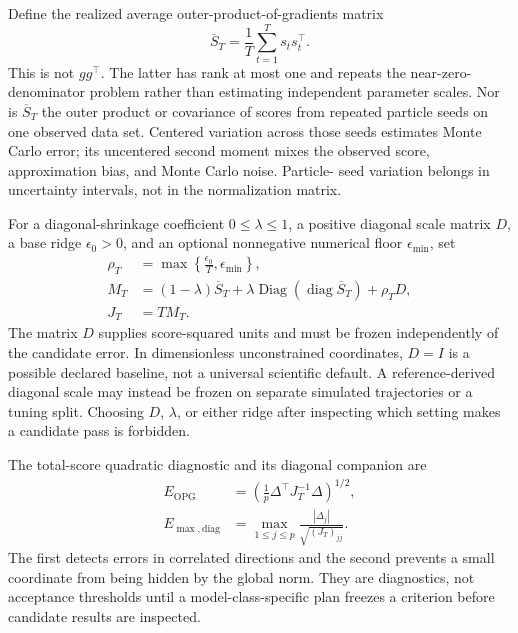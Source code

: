 Define the realized average outer-product-of-gradients matrix
\begin{equation}
  \overline S_T=\frac{1}{T}\sum_{t=1}^T s_t s_t^\top.
  \label{eq:bf-ledh-average-opg}
\end{equation}
This is not \(gg^\top\).  The latter has rank at most one and repeats the
near-zero-denominator problem rather than estimating independent parameter
scales.  Nor is \(\overline S_T\) the outer product or covariance of scores
from repeated particle seeds on one observed data set.  Centered variation
across those seeds estimates Monte Carlo error; its uncentered second moment
mixes the observed score, approximation bias, and Monte Carlo noise.  Particle-
seed variation belongs in uncertainty intervals, not in the normalization
matrix.

For a diagonal-shrinkage coefficient \(0\leq\lambda\leq1\), a positive
diagonal scale matrix \(D\), a base ridge \(\epsilon_0>0\), and an optional
nonnegative numerical floor \(\epsilon_{\min}\), set
\begin{align}
  \rho_T&=\max\left\{\frac{\epsilon_0}{T},\epsilon_{\min}\right\},
  \label{eq:bf-ledh-average-opg-ridge}\\
  M_T&=(1-\lambda)\overline S_T
       +\lambda\operatorname{Diag}(\operatorname{diag}\overline S_T)
       +\rho_TD,
  \label{eq:bf-ledh-average-opg-metric}\\
  J_T&=T M_T.
  \label{eq:bf-ledh-total-opg-metric}
\end{align}
The matrix \(D\) supplies score-squared units and must be frozen independently
of the candidate error.  In dimensionless unconstrained coordinates, \(D=I\)
is a possible declared baseline, not a universal scientific default.  A
reference-derived diagonal scale may instead be frozen on separate simulated
trajectories or a tuning split.  Choosing \(D\), \(\lambda\), or either ridge
after inspecting which setting makes a candidate pass is forbidden.

The total-score quadratic diagnostic and its diagonal companion are
\begin{align}
  E_{\mathrm{OPG}}
  &=\left(\frac{1}{p}\Delta^\top J_T^{-1}\Delta\right)^{1/2},
  \label{eq:bf-ledh-score-opg-error}\\
  E_{\max,\mathrm{diag}}
  &=\max_{1\leq j\leq p}
    \frac{|\Delta_j|}{\sqrt{(J_T)_{jj}}}.
  \label{eq:bf-ledh-score-opg-diagonal-error}
\end{align}
The first detects errors in correlated directions and the second prevents a
small coordinate from being hidden by the global norm.  They are diagnostics,
not acceptance thresholds until a model-class-specific plan freezes a
criterion before candidate results are inspected.

